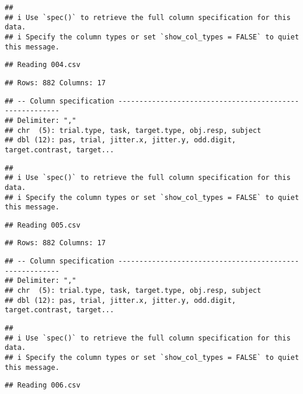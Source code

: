 \documentclass[
]{article}
\begin{document}
\begin{verbatim}
## 
## i Use `spec()` to retrieve the full column specification for this data.
## i Specify the column types or set `show_col_types = FALSE` to quiet this message.
\end{verbatim}

\begin{verbatim}
## Reading 004.csv
\end{verbatim}

\begin{verbatim}
## Rows: 882 Columns: 17
\end{verbatim}

\begin{verbatim}
## -- Column specification --------------------------------------------------------
## Delimiter: ","
## chr  (5): trial.type, task, target.type, obj.resp, subject
## dbl (12): pas, trial, jitter.x, jitter.y, odd.digit, target.contrast, target...
\end{verbatim}

\begin{verbatim}
## 
## i Use `spec()` to retrieve the full column specification for this data.
## i Specify the column types or set `show_col_types = FALSE` to quiet this message.
\end{verbatim}

\begin{verbatim}
## Reading 005.csv
\end{verbatim}

\begin{verbatim}
## Rows: 882 Columns: 17
\end{verbatim}

\begin{verbatim}
## -- Column specification --------------------------------------------------------
## Delimiter: ","
## chr  (5): trial.type, task, target.type, obj.resp, subject
## dbl (12): pas, trial, jitter.x, jitter.y, odd.digit, target.contrast, target...
\end{verbatim}

\begin{verbatim}
## 
## i Use `spec()` to retrieve the full column specification for this data.
## i Specify the column types or set `show_col_types = FALSE` to quiet this message.
\end{verbatim}

\begin{verbatim}
## Reading 006.csv
\end{verbatim}
\end{document}
